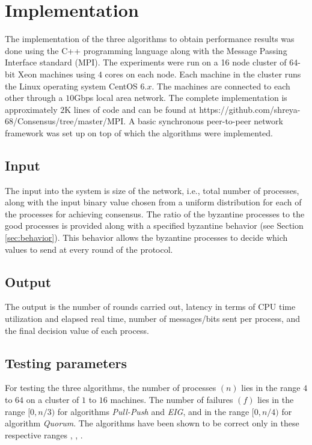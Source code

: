 ﻿\section{Implementation} \label{sec:eval} The implementation of the three
algorithms to obtain performance results was done using the C++ programming
language along with the Message Passing Interface standard (MPI).  The
experiments were run on a 16 node cluster of $64$-bit Xeon machines using $4$
cores on each node.  Each machine in the cluster runs the Linux operating
system CentOS $6.x$.  The machines are connected to each other through
a $10$Gbps local area network. The complete implementation is approximately
$2$K lines of code and can be found at
https://github.com/shreya-68/Consensus/tree/master/MPI. A basic synchronous
peer-to-peer network framework was set up on top of which the algorithms were
implemented.

\subsection{Input} The input into the system is size of the network, i.e.,
total number of processes, along with the input binary value chosen from a uniform distribution for each of the processes
for achieving consensus. The ratio of the byzantine processes to the good
processes is provided along with a specified byzantine behavior (see Section
\ref{sec:behavior}). This behavior allows the byzantine processes to decide
which values to send at every round of the protocol. 

\subsection{Output} The output is the number of rounds carried out, latency in
terms of CPU time utilization and elapsed real time, number of messages/bits
sent per process, and the final decision value of each process. 

\subsection{Testing parameters} For testing the three algorithms, the number of
processes $(n)$ lies in the range $4$ to $64$ on a cluster of $1$ to $16$
machines. The number of failures $(f)$ lies in the range $[0, n/3)$ for
    algorithms \textit{Pull-Push} and \textit{EIG}, and in the range $[0, n/4)$
        for algorithm \textit{Quorum}. The algorithms have been shown to be
        correct only in these respective ranges \cite{BGH13}, \cite{KM13},
        \cite{BPV06}. 

